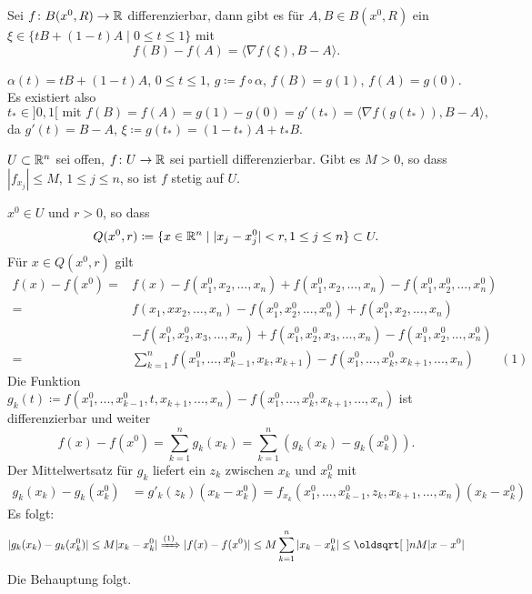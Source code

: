 \newpage
\begin{lemma}[Mittelwertsatz]
	Sei $ f\colon B(x^0,R)\rightarrow\mathbb{R} $ differenzierbar, dann gibt es f\"ur $ A,B\in B(x^0,R) $ ein $ \xi\in\lbrace tB+(1-t)A\mid 0\leq t\leq 1\rbrace $ mit \[ f(B)-f(A)=\langle\nabla f(\xi),B-A\rangle. \]
\end{lemma}
\begin{beweis}
	$ \alpha(t)=tB+(1-t)A $, $ 0\leq t\leq 1 $, $ g\coloneqq f\circ\alpha $, $ f(B)=g(1) $, $ f(A)=g(0) $. Es existiert also \[ t_\ast\in]0,1[ \text{ mit } f(B)=f(A)=g(1)-g(0)=g'(t_\ast)=\langle\nabla f(g(t_\ast)),B-A\rangle, \]
	da $ g'(t)=B-A $, $ \xi\coloneqq g(t_\ast)=(1-t_\ast)A+t_\ast B $.
\end{beweis}
\begin{lemma}
	$ U\subset\mathbb{R}^n $ sei offen, $ f\colon U\rightarrow\mathbb{R} $ sei partiell differenzierbar. Gibt es $ M>0 $, so dass $ |f_{x_j}|\leq M $, $ 1\leq j\leq n $, so ist $ f $ stetig auf $ U $.
\end{lemma}
\begin{beweis}
	$ x^0\in U $ und $ r>0 $, so dass \[ Q(x^0,r)\coloneqq\lbrace x\in\mathbb{R}^n\mid |x_j-x^0_j|<r,1\leq j\leq n\rbrace\subset U. \]
	F\"ur $ x\in Q(x^0,r) $ gilt \begin{align*} f(x)-f(x^0)=&f(x)-f(x_1^0,x_2,...,x_n)+f(x_1^0,x_2,...,x_n)-f(x_1^0,x_2^0,...,x_n^0)\\
	=&f(x_1,xx_2,...,x_n)-f(x_1^0,x_2^0,...,x_n^0)+f(x_1^0,x_2,...,x_n)\\&-f(x_1^0,x_2^0,x_3,...,x_n)+f(x_1^0,x_2^0,x_3,...,x_n)-f(x_1^0,x_2^0,...,x_n^0)\\
	=&\sum_{k=1}^{n}f(x_1^0,...,x_{k-1}^0,x_k,x_{k+1})-f(x_1^0,...,x_{k}^0,x_{k+1},...,x_n)\qquad(1) 
	\end{align*}
	Die Funktion $ g_k(t)\coloneqq f(x_1^0,...,x_{k-1}^0,t,x_{k+1},...,x_n)-f(x_1^0,...,x_k^0,x_{k+1},...,x_n) $ ist differenzierbar und weiter \[ f(x)-f(x^0)=\sum_{k=1}^{n}g_k(x_k)=\sum_{k=1}^{n}(g_k(x_k)-g_k(x_k^0)). \]
	Der Mittelwertsatz f\"ur $ g_k $ liefert ein $ z_k $ zwischen $ x_k $ und $ x_k^0 $ mit\begin{align*} g_k(x_k)-g_k(x_k^0)&=g'_k(z_k)(x_k-x_k^0)=f_{x_k}(x_1^0,...,x_{k-1}^0,z_k,x_{k+1},...,x_n)(x_k-x_k^0)
	\end{align*}
	Es folgt:
	\begin{align*}
	|g_k(x_k)-g_k(x_k^0)|\leq M|x_k-x_k^0|\xRightarrow[]{(1)}|f(x)-f(x^0)|\leq M\sum_{k=1}^{n}|x_k-x_k^0|\leq\sqrt n M|x-x^0|
	\end{align*}
	Die Behauptung folgt.
\end{beweis}
